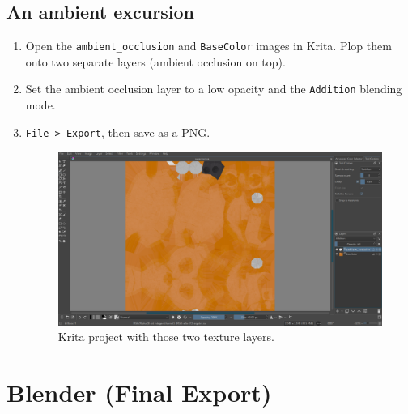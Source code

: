 \documentclass[12pt, letterpaper]{article}
\begin{document}
\subsection{An ambient excursion}
\begin{enumerate}
    \item Open the \verb|ambient_occlusion| and \verb|BaseColor| images in Krita. Plop them onto two separate layers (ambient occlusion on top).
    \item Set the ambient occlusion layer to a low opacity and the \verb|Addition| blending mode.
    \item \verb|File > Export|, then save as a PNG.
          \begin{figure}[H]
              \includegraphics[scale=0.4]{assets/img/krita-project.png}
              \caption{Krita project with those two texture layers.}
          \end{figure}
\end{enumerate}

\section{Blender (Final Export)}
\end{document}
